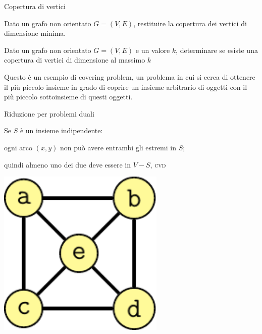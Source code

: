 \begin{frame}{Copertura di vertici}

\vspace{-9pt}
\begin{myboxtitle}
Dato un grafo non orientato $G=(V,E)$, restituire la copertura dei vertici
di dimensione minima.
\end{myboxtitle}

\begin{myboxtitle}
Dato un grafo non orientato $G=(V,E)$ e un valore $k$, determinare se
esiste una copertura di vertici di dimensione al massimo $k$
\end{myboxtitle}

\begin{myboxtitle}
Questo è un esempio di \alert{covering problem}, un problema in cui si cerca
di ottenere il più piccolo insieme in grado di coprire un insieme 
arbitrario di oggetti con il più piccolo sottoinsieme di questi oggetti.
\end{myboxtitle}

\end{frame}

\begin{frame}{Riduzione per problemi duali}

Se $S$ è un insieme indipendente:
\BI
\item ogni arco $(x,y)$ non può avere entrambi gli estremi in $S$; 
\item quindi almeno uno dei due deve essere in $V-S$, \textsc{cvd}
\EI

\begin{center}
\includegraphics[width=0.6\textwidth,page=3]{independent.pdf}
\end{center}

\end{frame}

